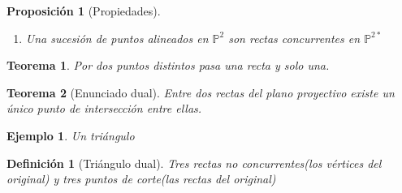 \documentclass[11pt, a4paper]{article}
\newif\IfInSansMode
\theoremstyle{theorem-style}
\newtheorem{nth}{Teorema}[section]
\newtheorem{nprop}{Proposición}[section]
\theoremstyle{definition-style}
\newtheorem{ndef}{Definición}[section]
\theoremstyle{remark-style}
\theoremstyle{example-style}
\newtheorem{ejemplo}{Ejemplo}[section]
\newenvironment{nlist}
{\begin{enumerate}
    \renewcommand\labelenumi{(\emph{\roman{enumi})}}}
  {\end{enumerate}}
\begin{document}
\begin{nprop}[Propiedades]
	\begin{nlist}
	\item Una sucesión de puntos alineados en $\mathbb P^2$ son rectas concurrentes en $\mathbb P^{2*}$
\end{nlist}
\end{nprop}

\begin{nth}
	Por dos puntos distintos pasa una recta y solo una.
\end{nth}

\begin{nth}[Enunciado dual]
	Entre dos rectas del plano proyectivo existe un único punto de intersección entre ellas.
\end{nth}

\begin{ejemplo}
	Un triángulo
\end{ejemplo}
\begin{ndef}[Triángulo dual]
	Tres rectas no concurrentes(los vértices del original) y tres puntos de corte(las rectas del original)
\end{ndef}
\end{document}
